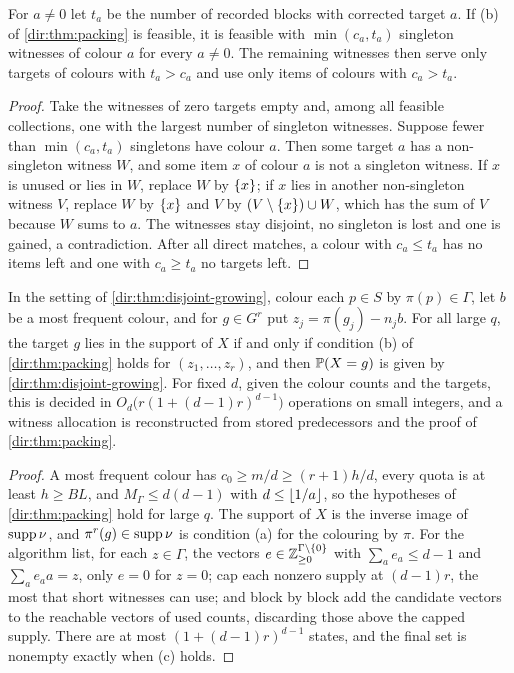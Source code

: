 \begin{lemma}\label{dir:lem:direct}
For $a\ne0$ let $t_a$ be the number of recorded blocks with corrected target $a$. If \textup{(b)} of
\cref{dir:thm:packing} is feasible, it is feasible with $\min(c_a,t_a)$ singleton witnesses of colour $a$
for every $a\ne0$. The remaining witnesses then serve only targets of colours with $t_a>c_a$ and use only
items of colours with $c_a>t_a$.
\end{lemma}

\begin{proof}
Take the witnesses of zero targets empty and, among all feasible collections, one with the largest number
of singleton witnesses. Suppose fewer than $\min(c_a,t_a)$ singletons have colour $a$. Then some target $a$
has a non-singleton witness $W$, and some item $x$ of colour $a$ is not a singleton witness. If $x$ is
unused or lies in $W$, replace $W$ by $\{x\}$; if $x$ lies in another non-singleton witness $V$, replace $W$
by $\{x\}$ and $V$ by $(V\setminus\{x\})\cup W$, which has the sum of $V$ because $W$ sums to $a$. The
witnesses stay disjoint, no singleton is lost and one is gained, a contradiction. After all direct
matches, a colour with $c_a\le t_a$ has no items left and one with $c_a\ge t_a$ no targets left.
\end{proof}

\begin{corollary}\label{dir:cor:anydensity}
In the setting of \cref{dir:thm:disjoint-growing}, colour each $p\in S$ by $\pi(p)\in\Gamma$, let $b$ be a
most frequent colour, and for $g\in G^r$ put $z_j=\pi(g_j)-n_jb$. For all large $q$, the target $g$ lies in
the support of $X$ if and only if condition \textup{(b)} of \cref{dir:thm:packing} holds for
$(z_1,\dots,z_r)$, and then $\mathbb{P}(X=g)$ is given by \cref{dir:thm:disjoint-growing}. For fixed $d$, given
the colour counts and the targets, this is decided in $O_d\bigl(r(1+(d-1)r)^{d-1}\bigr)$ operations on
small integers, and a witness allocation is reconstructed from stored predecessors and the proof of
\cref{dir:thm:packing}.
\end{corollary}

\begin{proof}
A most frequent colour has $c_0\ge m/d\ge(r+1)h/d$, every quota is at least $h\ge BL$, and
$M_\Gamma\le d(d-1)$ with $d\le\lfloor1/a\rfloor$, so the hypotheses of \cref{dir:thm:packing} hold for large $q$.
The support of $X$ is the inverse image of $\operatorname{supp}\nu$, and $\pi^r(g)\in\operatorname{supp}\nu$ is condition (a) for the
colouring by $\pi$. For the algorithm list, for each $z\in\Gamma$, the vectors $e\in\mathbb{Z}_{\ge0}^{\Gamma\setminus\{0\}}$
with $\sum_ae_a\le d-1$ and $\sum_ae_aa=z$, only $e=0$ for $z=0$; cap each nonzero supply at $(d-1)r$, the
most that short witnesses can use; and block by block add the candidate vectors to the reachable vectors of
used counts, discarding those above the capped supply. There are at most $(1+(d-1)r)^{d-1}$ states, and the
final set is nonempty exactly when (c) holds.
\end{proof}

